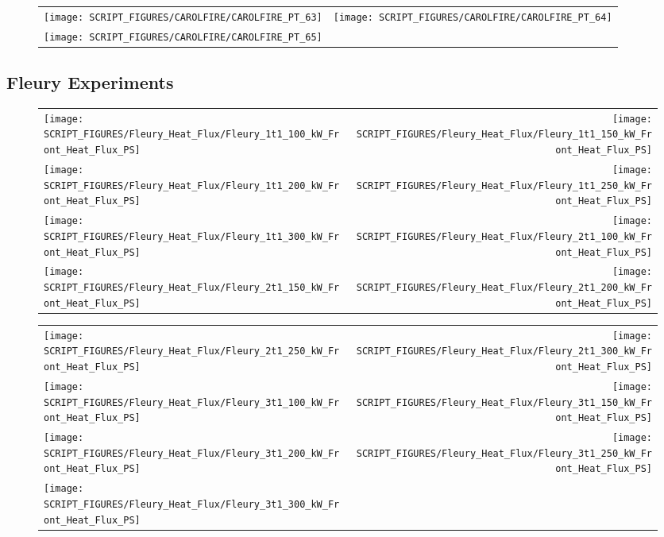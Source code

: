 \begin{figure}[p]
\begin{tabular*}{\textwidth}{l@{\extracolsep{\fill}}r}
\texttt{[image: SCRIPT\_FIGURES/CAROLFIRE/CAROLFIRE\_PT\_63]} &
\texttt{[image: SCRIPT\_FIGURES/CAROLFIRE/CAROLFIRE\_PT\_64]} \\
\texttt{[image: SCRIPT\_FIGURES/CAROLFIRE/CAROLFIRE\_PT\_65]}
\end{tabular*}
\end{figure}

\clearpage

\subsection{Fleury Experiments}

\begin{figure}[p]
\begin{tabular*}{\textwidth}{l@{\extracolsep{\fill}}r}
\texttt{[image: SCRIPT\_FIGURES/Fleury\_Heat\_Flux/Fleury\_1t1\_100\_kW\_Front\_Heat\_Flux\_PS]} &
\texttt{[image: SCRIPT\_FIGURES/Fleury\_Heat\_Flux/Fleury\_1t1\_150\_kW\_Front\_Heat\_Flux\_PS]} \\
\texttt{[image: SCRIPT\_FIGURES/Fleury\_Heat\_Flux/Fleury\_1t1\_200\_kW\_Front\_Heat\_Flux\_PS]} &
\texttt{[image: SCRIPT\_FIGURES/Fleury\_Heat\_Flux/Fleury\_1t1\_250\_kW\_Front\_Heat\_Flux\_PS]} \\
\texttt{[image: SCRIPT\_FIGURES/Fleury\_Heat\_Flux/Fleury\_1t1\_300\_kW\_Front\_Heat\_Flux\_PS]} &
\texttt{[image: SCRIPT\_FIGURES/Fleury\_Heat\_Flux/Fleury\_2t1\_100\_kW\_Front\_Heat\_Flux\_PS]} \\
\texttt{[image: SCRIPT\_FIGURES/Fleury\_Heat\_Flux/Fleury\_2t1\_150\_kW\_Front\_Heat\_Flux\_PS]} &
\texttt{[image: SCRIPT\_FIGURES/Fleury\_Heat\_Flux/Fleury\_2t1\_200\_kW\_Front\_Heat\_Flux\_PS]}
\end{tabular*}
\end{figure}

\begin{figure}[p]
\begin{tabular*}{\textwidth}{l@{\extracolsep{\fill}}r}
\texttt{[image: SCRIPT\_FIGURES/Fleury\_Heat\_Flux/Fleury\_2t1\_250\_kW\_Front\_Heat\_Flux\_PS]} &
\texttt{[image: SCRIPT\_FIGURES/Fleury\_Heat\_Flux/Fleury\_2t1\_300\_kW\_Front\_Heat\_Flux\_PS]} \\
\texttt{[image: SCRIPT\_FIGURES/Fleury\_Heat\_Flux/Fleury\_3t1\_100\_kW\_Front\_Heat\_Flux\_PS]} &
\texttt{[image: SCRIPT\_FIGURES/Fleury\_Heat\_Flux/Fleury\_3t1\_150\_kW\_Front\_Heat\_Flux\_PS]} \\
\texttt{[image: SCRIPT\_FIGURES/Fleury\_Heat\_Flux/Fleury\_3t1\_200\_kW\_Front\_Heat\_Flux\_PS]} &
\texttt{[image: SCRIPT\_FIGURES/Fleury\_Heat\_Flux/Fleury\_3t1\_250\_kW\_Front\_Heat\_Flux\_PS]} \\
\texttt{[image: SCRIPT\_FIGURES/Fleury\_Heat\_Flux/Fleury\_3t1\_300\_kW\_Front\_Heat\_Flux\_PS]}
\end{tabular*}
\end{figure}


